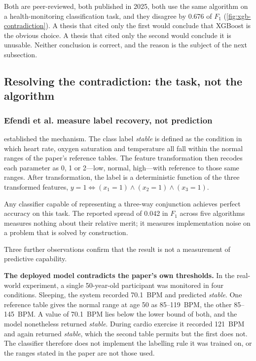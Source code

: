 \documentclass[12pt,a4paper,oneside]{report}
\begin{document}
Both are peer-reviewed, both published in 2025, both use the same algorithm on a health-monitoring classification task, and they disagree by 0.676 of $F_1$ (\cref{fig:xgb-contradiction}). A thesis that cited only the first would conclude that XGBoost is the obvious choice. A thesis that cited only the second would conclude it is unusable. Neither conclusion is correct, and the reason is the subject of the next subsection.

\subsection{Resolving the contradiction: the task, not the algorithm}\label{sec:task-not-algo}

\subsubsection{Efendi et al. measure label recovery, not prediction}

 established the mechanism. The class label \emph{stable} is defined as the condition in which heart rate, oxygen saturation and temperature all fall within the normal ranges of the paper's reference tables. The feature transformation then recodes each parameter as 0, 1 or 2---low, normal, high---with reference to those same ranges. After transformation, the label is a deterministic function of the three transformed features, $y = 1 \iff (x_1 = 1) \wedge (x_2 = 1) \wedge (x_3 = 1)$.

Any classifier capable of representing a three-way conjunction achieves perfect accuracy on this task. The reported spread of 0.042 in $F_1$ across five algorithms measures nothing about their relative merit; it measures implementation noise on a problem that is solved by construction.

Three further observations confirm that the result is not a measurement of predictive capability.

\textbf{The deployed model contradicts the paper's own thresholds.} In the real-world experiment, a single 50-year-old participant was monitored in four conditions. Sleeping, the system recorded 70.1~BPM and predicted \emph{stable}. One reference table gives the normal range at age 50 as 85--119~BPM, the other 85--145~BPM. A value of 70.1~BPM lies below the lower bound of both, and the model nonetheless returned \emph{stable}. During cardio exercise it recorded 121~BPM and again returned \emph{stable}, which the second table permits but the first does not. The classifier therefore does not implement the labelling rule it was trained on, or the ranges stated in the paper are not those used.
\end{document}
